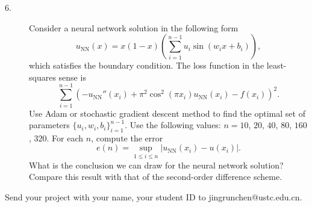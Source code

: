 \documentclass[12pt]{article}
\begin{document}
\begin{description}
\item[6.] Consider a neural network solution in the following form
\begin{equation}
u_{\mathrm{NN}}(x) = x(1-x)\left(\sum_{i=1}^{n-1} u_i \sin(w_i x + b_i) \right),
\end{equation}
which satisfies the boundary condition. The loss function in the least-squares sense is
\begin{equation}
\sum_{i=1}^{n-1} \left( -u_{\mathrm{NN}}''(x_i)+\pi^2 \cos^2(\pi x_i) u_{\mathrm{NN}}(x_i) - f(x_i) \right)^2.
\end{equation}
Use Adam or stochastic gradient descent method to find the optimal set of parameters $\{u_i, w_i, b_i\}_{i=1}^{n-1}$.
Use the following values: $n=10$, $20$, $40$, $80$, $160$, $320$. For each $n$, compute the error
\begin{equation}
e(n) = \sup_{1\le i \le n} |u_{\mathrm{NN}}(x_i) - u(x_i)|.
\end{equation}
What is the conclusion we can draw for the neural network solution? Compare this result with that of the second-order difference scheme.
\end{description}

Send your project with your name, your student ID to jingrunchen@ustc.edu.cn.
\end{document}
